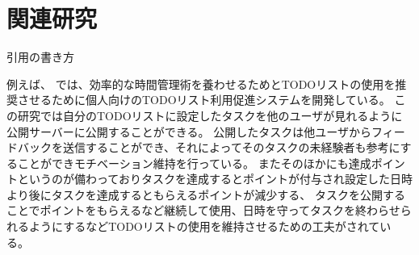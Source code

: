 \chapter{関連研究}
\label{cha:related}
引用の書き方

例えば、\cite{report} では、効率的な時間管理術を養わせるためとTODOリストの使用を推奨させるために個人向けのTODOリスト利用促進システムを開発している。
この研究では自分のTODOリストに設定したタスクを他のユーザが見れるように公開サーバーに公開することができる。
公開したタスクは他ユーザからフィードバックを送信することができ、それによってそのタスクの未経験者も参考にすることができモチベーション維持を行っている。
またそのほかにも達成ポイントというのが備わっておりタスクを達成するとポイントが付与され設定した日時より後にタスクを達成するともらえるポイントが減少する、
タスクを公開することでポイントをもらえるなど継続して使用、日時を守ってタスクを終わらせられるようにするなどTODOリストの使用を維持させるための工夫がされている。
